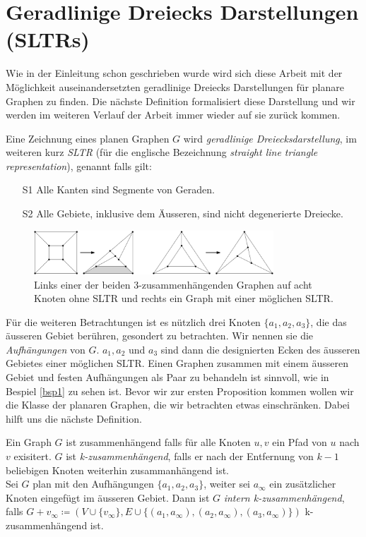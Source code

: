 \section{Geradlinige Dreiecks Darstellungen (SLTRs)}

Wie in der Einleitung schon geschrieben wurde wird sich diese Arbeit mit der Möglichkeit auseinandersetzten geradlinige Dreiecks Darstellungen für planare Graphen zu finden. Die nächste Definition formalisiert diese Darstellung und wir werden im weiteren Verlauf der Arbeit immer wieder auf sie zurück kommen.

\begin{definition}[SLTR]\label{defsltr}
Eine Zeichnung eines planen Graphen $G$ wird \textit{geradlinige Dreiecksdarstellung}, im weiteren kurz \textit{SLTR} (für die englische Bezeichnung \textit{straight line triangle representation}), genannt falls gilt:
\begin{itemize}
\item[S1] Alle Kanten sind Segmente von Geraden.
\item[S2] Alle Gebiete, inklusive dem Äusseren, sind nicht degenerierte Dreiecke.
\end{itemize}
\end{definition}

\begin{figure}[h]
	\centering
  \includegraphics[width=0.8\textwidth]{sltr-example.png}
	\caption{Links einer der beiden 3-zusammenhängenden Graphen auf acht Knoten ohne SLTR und rechts ein Graph mit einer möglichen SLTR.}
\end{figure}

Für die weiteren Betrachtungen ist es nützlich drei Knoten $\{a_1,a_2,a_3\}$, die das äusseren Gebiet berühren, gesondert zu betrachten. Wir nennen sie die \textit{Aufhängungen} von $G$. $a_1,a_2$ und $a_3$ sind dann die designierten Ecken des äusseren Gebietes einer möglichen SLTR. Einen Graphen zusammen mit einem äusseren Gebiet und festen Aufhängungen als Paar zu behandeln ist sinnvoll, wie in Bespiel \ref{bsp1} zu sehen ist. Bevor wir zur ersten Proposition kommen wollen wir die Klasse der planaren Graphen, die wir betrachten etwas einschränken. Dabei hilft uns die nächste Definition.

\begin{definition}\label{int_3_con}
Ein Graph $G$ ist zusammenhängend falls für alle Knoten $u,v$ ein Pfad von $u$ nach $v$ exisitert. $G$ ist \textit{k-zusammenhängend}, falls er nach der Entfernung von $k-1$ beliebigen Knoten weiterhin zusammanhängend ist.\\
Sei $G$ plan mit den Aufhängungen $\{a_1,a_2,a_3\}$, weiter sei $a_\infty$ ein zusätzlicher Knoten eingefügt im äusseren Gebiet. Dann ist $G$ \textit{intern k-zusammenhängend}, falls $G+v_\infty\coloneqq(V\cup\{v_\infty \},E\cup \{(a_1,a_\infty),(a_2,a_\infty),(a_3,a_\infty)\})$ k-zusammenhängend ist. 
\end{definition}

